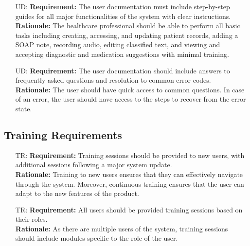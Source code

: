 \documentclass[12pt]{article}
\newcounter{udnum} %
\newcounter{trnum} %
\begin{document}
\begin{itemize}
\begin{itemize}
\begin{itemize}
  \item [UD\refstepcounter{udnum}\theudnum \label{UD_doc2}:] 
  \textbf{Requirement:} The user documentation must include step-by-step guides for all major functionalities of the system with clear instructions. \\
  \textbf{Rationale:} The healthcare professional should be able to perform all basic tasks including creating, accessing, and updating patient records, adding a SOAP note, recording audio, editing classified text, and viewing and accepting diagnostic and medication suggestions with minimal training.\\

  \item [UD\refstepcounter{udnum}\theudnum \label{UD_doc3}:] 
  \textbf{Requirement:} The user documentation should include answers to frequently asked questions and resolution to common error codes.\\
  \textbf{Rationale:} The user should have quick access to common questions. In case of an error, the user should have access to the steps to recover from the error state.\\ 
\end{itemize}

\subsection{Training Requirements}
\begin{itemize}

  \item [TR\refstepcounter{trnum}\thetrnum \label{TR_tr1}:] 
  \textbf{Requirement:} Training sessions should be provided to new users, with additional sessions following a major system update.\\
  \textbf{Rationale:} Training to new users ensures that they can effectively navigate through the system. Moreover, continuous training ensures that the user can adapt to the new features of the product. \\ 

  \item [TR\refstepcounter{trnum}\thetrnum \label{TR_tr2}:] 
  \textbf{Requirement:} All users should be provided training sessions based on their roles.\\
  \textbf{Rationale:} As there are multiple users of the system, training sessions should include modules specific to the role of the user.\\ 
\end{itemize}


\end{itemize}
\end{itemize}
\end{document}
